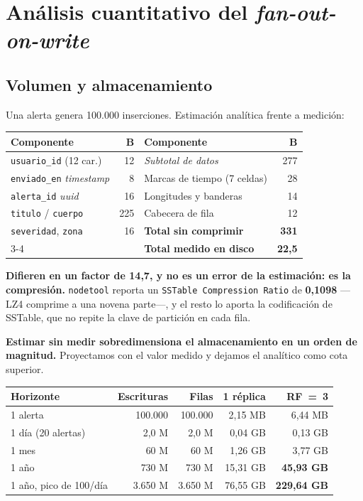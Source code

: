 \documentclass[11pt,a4paper]{article}
\begin{document}
\section{Análisis cuantitativo del \emph{fan-out-on-write}}
\subsection{Volumen y almacenamiento}
Una alerta genera 100.000 inserciones. Estimación analítica frente a medición:

\begin{center}\small
\begin{tabular}{@{}lrlr@{}}
\toprule
\textbf{Componente} & \textbf{B} & \textbf{Componente} & \textbf{B} \\
\midrule
\texttt{usuario\_id} (12 car.) & 12 & \emph{Subtotal de datos} & 277 \\
\texttt{enviado\_en} \emph{timestamp} & 8 & Marcas de tiempo (7 celdas) & 28 \\
\texttt{alerta\_id} \emph{uuid} & 16 & Longitudes y banderas & 14 \\
\texttt{titulo} / \texttt{cuerpo} & 225 & Cabecera de fila & 12 \\
\texttt{severidad}, \texttt{zona} & 16 & \textbf{Total sin comprimir} & \textbf{331} \\
\cmidrule(l){3-4}
& & \textbf{Total medido en disco} & \textbf{22,5} \\
\bottomrule
\end{tabular}
\end{center}

\begin{ojo}
\textbf{Difieren en un factor de 14,7, y no es un error de la estimación: es la
compresión.} \texttt{nodetool} reporta un \texttt{SSTable Compression Ratio} de
\textbf{0,1098} —LZ4 comprime a una novena parte—, y el resto lo aporta la codificación
de SSTable, que no repite la clave de partición en cada fila.

\smallskip
\textbf{Estimar sin medir sobredimensiona el almacenamiento en un orden de magnitud.}
Proyectamos con el valor medido y dejamos el analítico como cota superior.
\end{ojo}

\begin{center}\small
\begin{tabular}{@{}lrrrr@{}}
\toprule
\textbf{Horizonte} & \textbf{Escrituras} & \textbf{Filas} & \textbf{1 réplica} & \textbf{RF~=~3} \\
\midrule
1 alerta & 100.000 & 100.000 & 2,15 MB & 6,44 MB \\
1 día (20 alertas) & 2,0 M & 2,0 M & 0,04 GB & 0,13 GB \\
1 mes & 60 M & 60 M & 1,26 GB & 3,77 GB \\
1 año & 730 M & 730 M & 15,31 GB & \textbf{45,93 GB} \\
1 año, pico de 100/día & 3.650 M & 3.650 M & 76,55 GB & \textbf{229,64 GB} \\
\bottomrule
\end{tabular}
\end{center}
\end{document}
